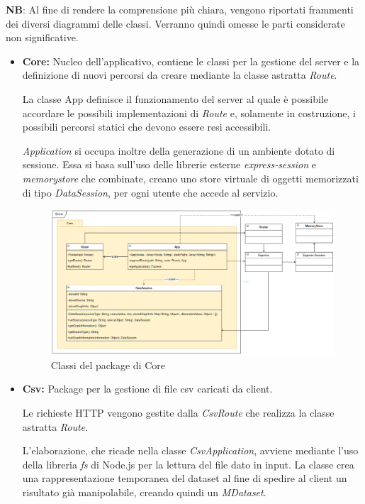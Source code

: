 \documentclass[../manuale_sviluppatore.tex]{subfiles}
\begin{document}
\textbf{NB}: Al fine di rendere la comprensione più chiara, vengono riportati frammenti dei diversi 
diagrammi delle classi. Verranno quindi omesse le parti considerate non significative.
\newpage

\begin{itemize}
	
	\item \textbf{Core:} Nucleo dell'applicativo, contiene le classi per la gestione del server
	e la definizione di nuovi percorsi da creare mediante la classe astratta \emph{Route}. 
	
	La classe App definisce il funzionamento del server al quale è possibile accordare le 
	possibili implementazioni di \emph{Route} e, solamente in costruzione, i possibili 
	percorsi statici che devono essere resi accessibili. 
	
	\emph{Application} si occupa inoltre della generazione di un ambiente dotato di sessione. Essa 
	si basa sull'uso delle librerie esterne \emph{express-session} e \emph{memorystore} che 
	combinate, creano uno store virtuale di oggetti memorizzati di tipo \emph{DataSession}, per ogni 
	utente che accede al servizio.
		
	\begin{figure}[H]
		\centering
		\includegraphics[width=18cm]{src/img/server-core.png}
		\caption{Classi del package di Core}
	\end{figure}

	\newpage
	\item \textbf{Csv:} Package per la gestione di file csv caricati da client. 
	
	Le richieste HTTP vengono gestite dalla \emph{CsvRoute} che realizza la classe astratta 
	\emph{Route}.
	
	L'elaborazione, che ricade nella classe \emph{CsvApplication}, avviene mediante l'uso della 
	libreria \emph{fs} di Node.js per la lettura del file dato in input. La classe crea una 
	rappresentazione temporanea del dataset al fine di spedire al client un risultato già 
	manipolabile, creando quindi un \emph{MDataset}.
	

\end{itemize}
\end{document}
